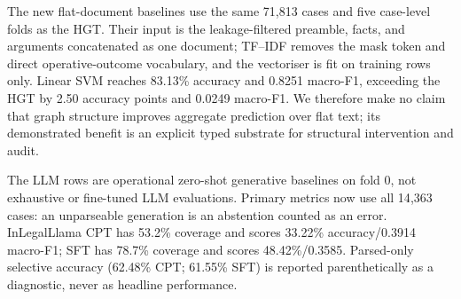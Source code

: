\documentclass[runningheads]{llncs}
\begin{document}
The new flat-document baselines use the same 71{,}813 cases and five case-level folds as the HGT. Their input is the leakage-filtered preamble, facts, and arguments concatenated as one document; TF--IDF removes the mask token and direct operative-outcome vocabulary, and the vectoriser is fit on training rows only. Linear SVM reaches 83.13\% accuracy and 0.8251 macro-F1, exceeding the HGT by 2.50 accuracy points and 0.0249 macro-F1. We therefore make no claim that graph structure improves aggregate prediction over flat text; its demonstrated benefit is an explicit typed substrate for structural intervention and audit.

The LLM rows are operational zero-shot generative baselines on fold 0, not exhaustive or fine-tuned LLM evaluations. Primary metrics now use all 14{,}363 cases: an unparseable generation is an abstention counted as an error. InLegalLlama CPT has 53.2\% coverage and scores 33.22\% accuracy/0.3914 macro-F1; SFT has 78.7\% coverage and scores 48.42\%/0.3585. Parsed-only selective accuracy (62.48\% CPT; 61.55\% SFT) is reported parenthetically as a diagnostic, never as headline performance.
\end{document}
